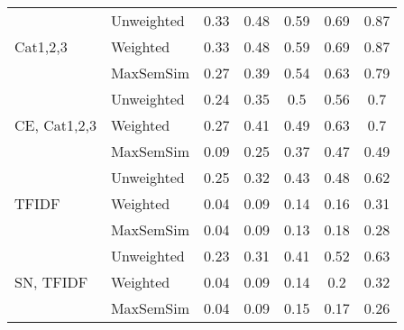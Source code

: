 \documentclass[conference]{IEEEtran}
\begin{document}
\begin{table*}[!h]
\begin{tabular}{l||l|ccccc}
		\multirow{3}{*}{Cat1,2,3} & Unweighted & 0.33 & 0.48 & 0.59 & 0.69 & 0.87\\
		 & Weighted & 0.33 & 0.48 & 0.59 & 0.69 & 0.87\\
		 & MaxSemSim & 0.27 & 0.39 & 0.54 & 0.63 & 0.79\\ 
		\hline
		
		\multirow{3}{*}{CE, Cat1,2,3} & Unweighted & 0.24 & 0.35 & 0.5 & 0.56 & 0.7\\
		 & Weighted & 0.27 & 0.41 & 0.49 & 0.63 & 0.7\\
		 & MaxSemSim & 0.09 & 0.25 & 0.37 & 0.47 & 0.49\\ 
		\hline
		
		\multirow{3}{*}{TFIDF} & Unweighted & 0.25 & 0.32 & 0.43 & 0.48 & 0.62\\
		 & Weighted & 0.04 & 0.09 & 0.14 & 0.16 & 0.31\\
		 & MaxSemSim & 0.04 & 0.09 & 0.13 & 0.18 & 0.28\\ 
		\hline
		
		\multirow{3}{*}{SN, TFIDF} & Unweighted & 0.23 & 0.31 & 0.41 & 0.52 & 0.63\\
		 & Weighted & 0.04 & 0.09 & 0.14 & 0.2 & 0.32\\
		 & MaxSemSim & 0.04 & 0.09 & 0.15 & 0.17 & 0.26\\ 
		\hline		
	\end{tabular}
\end{table*}		
		
\end{document}
